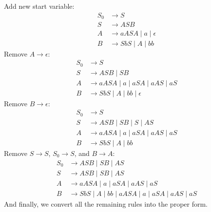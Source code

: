 \documentclass{article}
\numberwithin{equation}{subsection}
\begin{document}
\subsection{}
Add new start variable:
\begin{equation}
\begin{aligned}
S_0 &\rightarrow S\\
S &\rightarrow ASB\\
A &\rightarrow aASA \mid a \mid \epsilon\\
B &\rightarrow SbS \mid A \mid bb
\end{aligned}
\end{equation}
Remove \(A \rightarrow \epsilon\):
\begin{equation}
\begin{aligned}
    S_0 &\rightarrow S\\
    S &\rightarrow ASB \mid SB\\
    A &\rightarrow aASA \mid a \mid aSA \mid aAS \mid aS\\
    B &\rightarrow SbS \mid A \mid bb \mid \epsilon
    \end{aligned}
\end{equation}
Remove \(B \rightarrow \epsilon\):
\begin{equation}
\begin{aligned}
    S_0 &\rightarrow S\\
    S &\rightarrow ASB \mid SB \mid S \mid AS\\
    A &\rightarrow aASA \mid a \mid aSA \mid aAS \mid aS\\
    B &\rightarrow SbS \mid A \mid bb
    \end{aligned}
\end{equation}
Remove \(S \rightarrow S\), \(S_0 \rightarrow S\), and \(B \rightarrow A\):
\begin{equation}
\begin{aligned}
S_0 &\rightarrow ASB \mid SB \mid AS\\
S &\rightarrow ASB \mid SB \mid AS\\
A &\rightarrow aASA \mid a \mid aSA \mid aAS \mid aS\\
B &\rightarrow SbS \mid A \mid bb \mid aASA \mid a \mid aSA \mid aAS \mid aS
\end{aligned}
\end{equation}
And finally, we convert all the remaining rules into the proper form.
\end{document}
